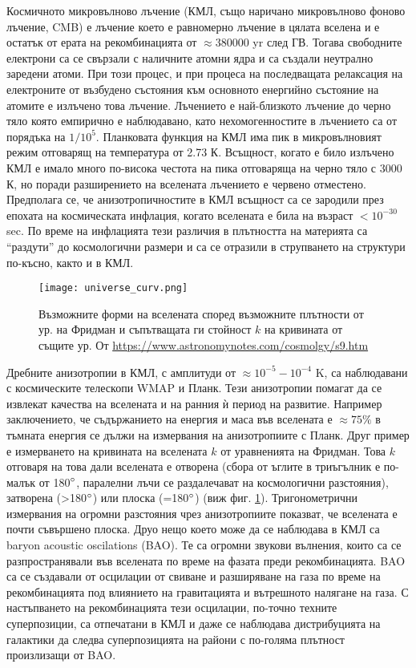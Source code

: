 \documentclass[a4paper,12pt]{article}
\begin{document}
Космичното микровълново лъчение (КМЛ, също наричано микровълново фоново лъчение, CMB) е лъчение което е равномерно лъчение в цялата вселена и е остатък от ерата на рекомбинацията от $\approx 380 000$ yr след ГВ. Тогава свободните електрони са се свързали с наличните атомни ядра и са създали неутрално заредени атоми. При този процес, и при процеса на последващата релаксация на електроните от възбудено състояния към основното енергийно състояние на атомите е излъчено това лъчение. Лъчението е най-близкото лъчение до черно тяло която емпирично е наблюдавано, като нехомогенностите в лъчението са от порядъка на $1/10^5$. Планковата функция на КМЛ има пик в микровълновият режим отговарящ на температура от 2.73 К. Всъщност, когато е било излъчено КМЛ е имало много по-висока честота на пика отговаряща на черно тяло с 3000 К, но поради разширението на вселената лъчението е червено отместено. Предполага се, че анизотропичностите в КМЛ всъщност са се зародили през епохата на космическата инфлация, когато вселената е била на възраст $<10^{-30}$ sec. По време на инфлацията тези различия в плътността на материята са “раздути” до космологични размери и са се отразили в струпването на структури по-късно, както и в КМЛ.\\

\begin{figure}[h!] %
\centering
\texttt{[image: universe\_curv.png]}
\caption{Възможните форми на вселената според възможните плътности от ур. на Фридман и съпътващата ги стойност $k$ на кривината от същите ур. От \url{https://www.astronomynotes.com/cosmolgy/s9.htm}}
\label{fig:universe_curv}
\end{figure}

Дребните анизотропии в КМЛ, с амплитуди от $\approx 10^{-5}-10^{-4}$ K, са наблюдавани с космическите телескопи WMAP и Планк. Тези анизотропии помагат да се извлекат качества на вселената и на ранния ѝ период на развитие. Например заключението, че съдържанието на енергия и маса във вселената е $\approx 75\%$ в тъмната енергия се дължи на измервания на анизотропиите с Планк. Друг пример е измерването на кривината на вселената $k$ от уравненията на Фридман. Това $k$ отговаря на това дали вселената е отворена (сбора от ъглите в триъгълник е по-малък от 180$\degree$, паралелни лъчи се раздалечават на космологични разстояния), затворена (>180$\degree$) или плоска (=180$\degree$) (виж фиг. \ref{fig:universe_curv}). Тригонометрични измервания на огромни разстояния чрез анизотропиите показват, че вселената е почти съвършено плоска. Друо нещо което може да се наблюдава в КМЛ са baryon acoustic oscilations (BAO). Те са огромни звукови вълнения, които са се разпространявали във вселената по време на фазата преди рекомбинацията. BAO са се създавали от осцилации от свиване и разширяване на газа по време на рекомбинацията под влиянието на гравитацията и вътрешното налягане на газа. С настъпването на рекомбинацията тези осцилации, по-точно техните суперпозиции, са отпечатани в КМЛ и даже се наблюдава дистрибуцията на галактики да следва суперпозицията на райони с по-голяма плътност произлизащи от BAO.\\
\end{document}
